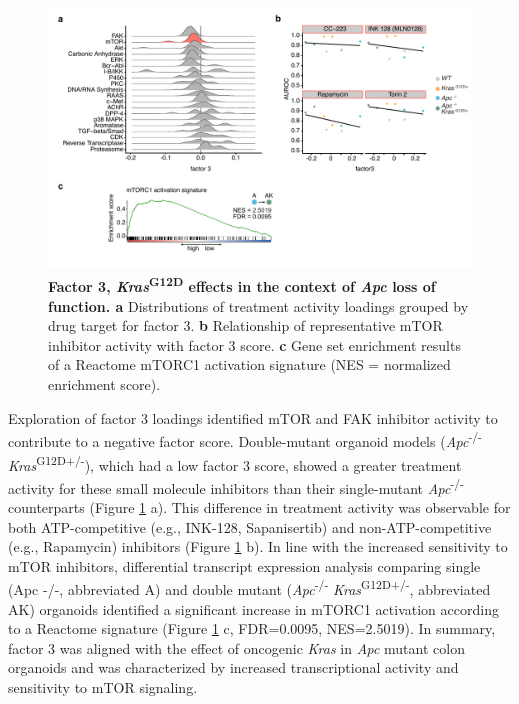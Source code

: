 \begin{flushleft}
\begin{figure}[h]
\centering
\includegraphics[scale=0.75,
                keepaspectratio]{figures/adenomaprofiling/pdf/fig_4_1_1.pdf}
\caption[Factor 3, \textit{Kras}\textsuperscript{G12D} effects in the context of \textit{Apc} loss of function]{\textbf{Factor 3, \textit{Kras}\textsuperscript{G12D} effects in the context of \textit{Apc} loss of function. a} Distributions of treatment activity loadings grouped by drug target for factor 3. \textbf{b} Relationship of representative mTOR inhibitor activity with factor 3 score. \textbf{c} Gene set enrichment results of a Reactome mTORC1 activation signature (NES = normalized enrichment score).}
\label{fig_300}
\end{figure}
\bigbreak

Exploration of factor 3 loadings identified mTOR and FAK inhibitor activity to contribute to a negative factor score. Double-mutant organoid models (\textit{Apc}\textsuperscript{-/-} \textit{Kras}\textsuperscript{G12D+/-}), which had a low factor 3 score, showed a greater treatment activity for these small molecule inhibitors than their single-mutant \textit{Apc}\textsuperscript{-/-}  counterparts (Figure \ref{fig_300} a). This difference in treatment activity was observable for both ATP-competitive (e.g., INK-128, Sapanisertib) and non-ATP-competitive (e.g., Rapamycin) inhibitors (Figure \ref{fig_300} b). In line with the increased sensitivity to mTOR inhibitors, differential transcript expression analysis comparing single (Apc -/-, abbreviated A) and double mutant (\textit{Apc}\textsuperscript{-/-} \textit{Kras}\textsuperscript{G12D+/-}, abbreviated AK) organoids identified a significant increase in mTORC1 activation according to a Reactome signature (Figure \ref{fig_300} c, FDR=0.0095, NES=2.5019). In summary, factor 3 was aligned with the effect of oncogenic \textit{Kras} in \textit{Apc} mutant colon organoids and was characterized by increased transcriptional activity and sensitivity to mTOR signaling.



\end{flushleft}
